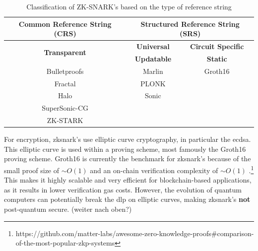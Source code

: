\begin{table}[H]
  \small
  \centering
    \begin{tabular}{cccc}
    \toprule
    \textbf{Common Reference String (CRS)} & \multicolumn{3}{c}{\textbf{Structured Reference String (SRS)}} \\
    \midrule
    \multirow{2}[4]{*}{\textbf{Transparent}} & \multicolumn{2}{c}{\textbf{Universal}} & \multicolumn{1}{c}{\textbf{Circuit Specific}} \\
\cmidrule{2-4}          & \multicolumn{2}{c}{\textbf{Updatable}} & \textbf{Static} \\
    \midrule
    Bulletproofs \cite{bunzBulletproofsShortProofs2018} & \multicolumn{2}{c}{Marlin \cite{chiesaMarlinPreprocessingZkSNARKs2020}} & Groth16 \cite{grothSizePairingBasedNoninteractive2016} \\
    Fractal \cite{chiesaFractalPostquantumTransparent2020} & \multicolumn{2}{c}{PLONK \cite{gabizonPlonKPermutationsLagrangebases}} &  \\
    Halo \cite{boweRecursiveProofComposition}  & \multicolumn{2}{c}{Sonic \cite{mallerSonicZeroKnowledgeSNARKs2019}} &  \\
    SuperSonic-CG \cite{bunzTransparentSNARKsDARK2020} &  &  \\
    ZK-STARK \cite{ben-sassonScalableTransparentPostquantum} &       &       &  \\
    \bottomrule
    \end{tabular}%
  \caption{Classification of ZK-SNARK's based on the type of reference string}
  \label{tab:snarks-classification}%
\end{table}%

For encryption, \acrshort{zksnark}'s use elliptic curve cryptography, in particular the \acrfull{ecdsa}. This elliptic curve is used within a proving scheme, most famously the Groth16 \cite{grothSizePairingBasedNoninteractive2016} proving scheme. Groth16 is currently the benchmark for \acrshort{zksnark}'s because of the small proof size of $\sim O(1)$ and an on-chain verification complexity of $\sim O(1)$ \cite{sallerasZPiEZeroKnowledgeProofs2021}.\footnote{\label{gh_zkp}https://github.com/matter-labs/awesome-zero-knowledge-proofs\#comparison-of-the-most-popular-zkp-systems} This makes it highly scalable and very efficient for blockchain-based applications, as it results in lower verification gas costs. However, the evolution of quantum computers can potentially break the \acrfull{dlp} on elliptic curves, making \acrshort{zksnark}'s \textbf{not} post-quantum secure. (weiter nach oben?)

